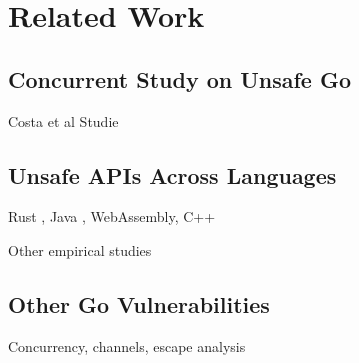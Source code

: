 
\chapter{Related Work}\label{ch:related-work}



\section{Concurrent Study on Unsafe Go}\label{sec:related-work:concurrent-study}

Costa et al Studie \cite{costa2020}



\section{Unsafe APIs Across Languages}\label{sec:related-work:unsafe-across-languages}

Rust \cite{evans2020, qin2020}, Java \cite{huang2019, mastrangelo2015, wickert2019}, WebAssembly, C++ \cite{alnaeli2017, larochelle2001}

Other empirical studies \cite{difranco2017, lu2013, chou2001, leesatapornwongsa2016, lauinger2017, jin2012, gunawi2014, gu2015}



\section{Other Go Vulnerabilities}\label{sec:related-work:other-go-vulnerabilities}

Concurrency, channels, escape analysis \cite{wang2020, sibiryov2017, tu2019, giunti2020, lange2017, zhou2017, dilley2019, hill2002, hannan1998, choi1999}


